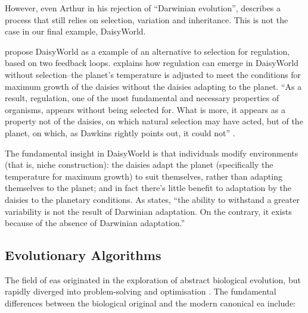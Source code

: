 However, even Arthur in his rejection of ``Darwinian evolution'', describes a process that still relies on selection, variation and inheritance. This is not the case in our final example, DaisyWorld.

\Textcite{LovelockMargulis2011} propose DaisyWorld as a example of an alternative to selection for regulation, based on two feedback loops. \Textcite{Saunders1994} explains how regulation can emerge in DaisyWorld without selection--the planet's temperature is adjusted to meet the conditions for maximum growth of the daisies without the daisies adapting to the planet. ``As a result, regulation, one of the most fundamental and necessary properties of organisms, appears without being selected for. What is more, it appears as a property not of the daisies, on which natural selection may have acted, but of the planet, on which, as Dawkins rightly points out, it could not'' \parencite{Saunders1994}.

The fundamental insight in DaisyWorld is that individuals modify environments (that is, niche construction): the daisies adapt the planet (specifically the temperature for maximum growth) to suit themselves, rather than adapting themselves to the planet; and in fact there's little benefit to adaptation by the daisies to the planetary conditions. As \textcite{Saunders1994} states, ``the ability to withstand a greater variability is not the result of Darwinian adaptation. On the contrary, it exists because of the absence of Darwinian adaptation.''

\subsection{Evolutionary Algorithms}\label{ea}

The field of \glspl{ea} originated in the exploration of abstract biological evolution, but rapidly diverged into problem-solving and optimisation \parencite{De-Jong:1993gy,DeJong2006}. The fundamental differences between the biological original and the modern canonical \gls{ea} include:

